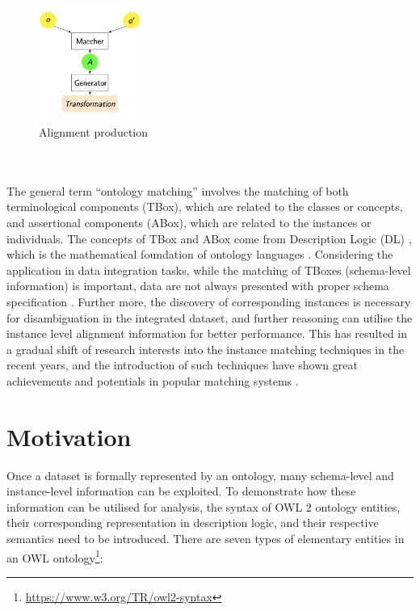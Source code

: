 \begin{figure}[ht]
\begin{center}
\includegraphics[width=0.3\textwidth]{img/ontomatch.png}
\caption{Alignment production}
\label{fig:align}
\end{center}
\end{figure}
\\\\
The general term ``ontology matching'' involves the matching of both terminological components (TBox), which are related to the classes or concepts, and assertional components (ABox), which are related to the instances or individuals. The concepts of TBox and ABox come from Description Logic (DL) \cite{DBLP:books/daglib/0041477}, which is the mathematical foundation of ontology languages \cite{DBLP:journals/cacm/Horrocks08}. Considering the application in data integration tasks, while the matching of TBoxes (schema-level information) is important, data are not always presented with proper schema specification \cite{DBLP:conf/boemie/CastanoFMV11}. Further more, the discovery of corresponding instances is necessary for disambiguation in the integrated dataset, and further reasoning can utilise the instance level alignment information for better performance. This has resulted in a gradual shift of research interests into the instance matching techniques in the recent years, and the introduction of such techniques have shown great achievements and potentials in popular matching systems \cite{DBLP:conf/scdm/AbubakarHMA18}.


\section{Motivation}

Once a dataset is formally represented by an ontology, many schema-level and instance-level information can be exploited. To demonstrate how these information can be utilised for analysis, the syntax of OWL 2 ontology entities, their corresponding representation in description logic, and their respective semantics need to be introduced. There are seven types of elementary entities in an OWL ontology\footnote{\url{https://www.w3.org/TR/owl2-syntax}}:

